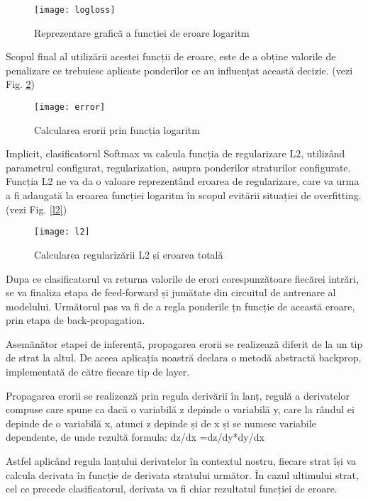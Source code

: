 	\vfill
	
	\begin{figure}[H]
		\texttt{[image: logloss]}
		\caption{\label{fig:logloss} Reprezentare grafică a funcției de eroare logaritm}
	\end{figure}


	Scopul final al utilizării acestei funcții de eroare, este de a obține valorile de penalizare ce trebuiesc aplicate ponderilor ce au influențat această decizie. (vezi Fig. \ref{fig:error})
	
	\begin{figure}[H]
		\texttt{[image: error]}
		\caption{\label{fig:error} Calcularea erorii prin funcția logaritm}
	\end{figure}

	
	Implicit, clasificatorul Softmax va calcula funcția de regularizare L2, utilizând parametrul configurat, regularization, asupra ponderilor straturilor configurate. Funcția L2 ne va da o valoare reprezentând eroarea de regularizare, care va urma a fi adaugată la eroarea funcției logaritm în scopul evitării situației de overfitting. (vezi Fig. \ref{l2})


	\begin{figure}[H]
		\texttt{[image: l2]}
		\caption{\label{fig:l2} Calcularea regularizării L2 și eroarea totală}
	\end{figure}

	Dupa ce clasificatorul va returna valorile de erori corespunzătoare fiecărei intrări, se va finaliza etapa de feed-forward și jumătate din circuitul de antrenare al modelului. Următorul pas va fi de a regla ponderile țn funcție de această eroare, prin etapa de back-propagation.
	 
	Asemănător etapei de inferență, propagarea erorii se realizează diferit de la un tip de strat la altul. De aceea aplicația noastră declara o metodă abstractă backprop, implementată de către fiecare tip de layer.
	
	Propagarea erorii se realizează prin regula derivării în lanț, regulă a derivatelor compuse care spune ca dacă o variabilă z depinde o variabilă y, care la rândul ei depinde de o variabilă x, atunci z depinde și de x și se numesc variabile dependente, de unde rezultă formula:  dz/dx  =dz/dy*dy/dx
	
	Astfel aplicând regula lanțului derivatelor în contextul nostru, fiecare strat își va calcula derivata în funcție de derivata stratului următor. În cazul ultimului strat, cel ce precede clasificatorul, derivata va fi chiar rezultatul funcției de eroare.
	
